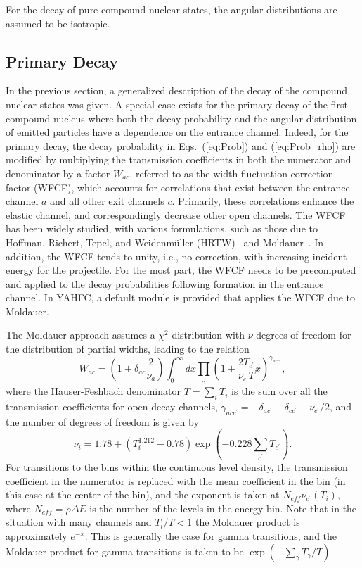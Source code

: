 \documentclass[
10pt,
showpacs,preprintnumbers,footinbib,
amsfonts,amsmath,amssymb,
aps,
prc,twocolumn,groupedaddress,superscriptaddress,
showkeys,
nofootinbib
]{revtex4-1}
\begin{document}
For the decay of pure compound nuclear states, the angular distributions are assumed to be isotropic. 

\subsection{Primary Decay}

In the previous section, a generalized description of the decay of the compound nuclear states was given. A special case exists for the primary decay of the first compound nucleus where both the decay probability and the angular distribution of emitted particles have a dependence on the entrance channel. Indeed, for the primary decay, the decay probability in Eqs.~(\ref{eq:Prob}) and (\ref{eq:Prob_rho}) are modified by multiplying the transmission coefficients in both the numerator and denominator by a factor $W_{ac}$, referred to as the width fluctuation correction factor (WFCF), which accounts for correlations that exist between the entrance channel $a$ and all other exit channels $c$. Primarily, these correlations enhance the elastic channel, and correspondingly decrease other open channels. The WFCF has been widely studied, with various formulations, such as those due to Hoffman, Richert, Tepel, and Weidenm\" uller (HRTW)~\cite{Tepel:1974,Hofmann:1975,Hofmann:1980} and Moldauer~\cite{Moldauer:1976,Moldauer:1980}. In addition, the WFCF tends to unity, i.e., no correction, with increasing incident energy for the projectile. For the most part, the WFCF needs to be precomputed and applied to the decay probabilities following formation in the entrance channel. In YAHFC, a default module is provided that applies the WFCF due to Moldauer. 

The Moldauer approach assumes a $\chi^2$ distribution with $\nu$ degrees of freedom for the distribution of partial widths, leading to the relation
\begin{equation}
W_{ac} = \left(1+\delta_{ac}\frac{2}{\nu_a}\right) \int_0^\infty dx \prod_{c^\prime}\left( 1 + \frac{2T_{c^\prime}}{\nu_{c^\prime} T}x\right)^{\gamma_{acc^\prime}},
\label{eq:WFCF}
\end{equation}
where the Hauser-Feshbach denominator $T=\sum_i T_i$ is the sum over all the transmission coefficients for open decay channels, $\gamma_{acc^\prime} = -\delta_{ac^\prime} - \delta_{cc^\prime} - \nu_{c^\prime}/2$, and the number of degrees of freedom is given by
\begin{equation}
\nu_i = 1.78 +(T_i^{1.212} - 0.78)\exp\left( -0.228\sum_{c^\prime} T_{c^\prime}\right).
\end{equation}
For transitions to the bins within the continuous level density, the transmission coefficient in the numerator is replaced with the mean coefficient in the bin (in this case at the center of the bin), and the exponent is taken at $N_{eff}\nu_{c^\prime}(T_i)$, where $N_{eff}=\rho\Delta E$ is the number of the levels in the energy bin. Note that in the situation with many channels and $T_i/T < 1$ the Moldauer product is approximately $e^{-x}$. This is generally the case for gamma transitions, and the Moldauer product for gamma transitions is taken to be $\exp(-\sum_\gamma T_\gamma/T)$.
\end{document}
